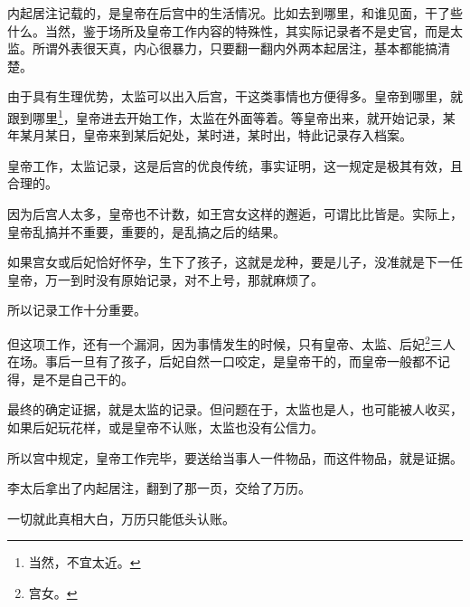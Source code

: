 \begin{multicols}{\theparacolNo}
内起居注记载的，是皇帝在后宫中的生活情况。比如去到哪里，和谁见面，干了些什么。当然，鉴于场所及皇帝工作内容的特殊性，其实际记录者不是史官，而是太监。所谓外表很天真，内心很暴力，只要翻一翻内外两本起居注，基本都能搞清楚。

由于具有生理优势，太监可以出入后宫，干这类事情也方便得多。皇帝到哪里，就跟到哪里\footnote{当然，不宜太近。}，皇帝进去开始工作，太监在外面等着。等皇帝出来，就开始记录，某年某月某日，皇帝来到某后妃处，某时进，某时出，特此记录存入档案。

皇帝工作，太监记录，这是后宫的优良传统，事实证明，这一规定是极其有效，且合理的。

因为后宫人太多，皇帝也不计数，如王宫女这样的邂逅，可谓比比皆是。实际上，皇帝乱搞并不重要，重要的，是乱搞之后的结果。

如果宫女或后妃恰好怀孕，生下了孩子，这就是龙种，要是儿子，没准就是下一任皇帝，万一到时没有原始记录，对不上号，那就麻烦了。

所以记录工作十分重要。

但这项工作，还有一个漏洞，因为事情发生的时候，只有皇帝、太监、后妃\footnote{宫女。}三人在场。事后一旦有了孩子，后妃自然一口咬定，是皇帝干的，而皇帝一般都不记得，是不是自己干的。

最终的确定证据，就是太监的记录。但问题在于，太监也是人，也可能被人收买，如果后妃玩花样，或是皇帝不认账，太监也没有公信力。

所以宫中规定，皇帝工作完毕，要送给当事人一件物品，而这件物品，就是证据。

李太后拿出了内起居注，翻到了那一页，交给了万历。

一切就此真相大白，万历只能低头认账。

\ifnum{}
	\end{multicols}
\fi
\newpage
